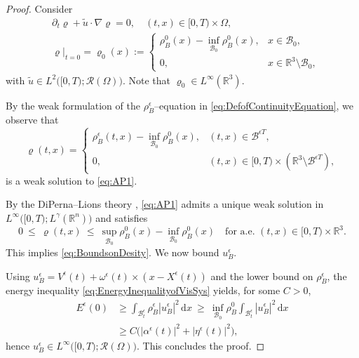 \documentclass[11pt,twoside,reqno]{amsart}
\numberwithin{equation}{section}
\numberwithin{figure}{section}
\begin{document}
\begin{proof}
Consider
\begin{equation}\label{eq:AP1}
\begin{aligned}
&\partial_t \varrho + {\tilde{u}}\cdot \nabla \varrho = 0,\quad (t,x)\in [0,T)\times \Omega,\\
&\varrho\big|_{t=0} = \varrho_0(x) :=
\begin{cases}
\rho_B^0(x) - \inf_{\mathcal{B}_0} \rho_B^0(x), & x \in \mathcal{B}_0,\\
0, & x \in \mathbb{R}^3 \setminus \mathcal{B}_0,
\end{cases}
\end{aligned}
\end{equation}
with $\tilde{u} \in L^2\big([0,T); \mathcal{R}(\Omega)\big)$. Note that $\varrho_0 \in L^\infty(\mathbb{R}^3)$.

By the weak formulation of the $\rho_B^\epsilon$–equation in \eqref{eq:DefofContinuityEquation}, we observe that
\[
\varrho(t,x) =
\begin{cases}
\rho_B^\epsilon(t,x) - \inf_{\mathcal{B}_0} \rho_B^0(x), & (t,x) \in \mathcal{B}^{\epsilon T},\\
0, & (t,x) \in [0,T)\times (\mathbb{R}^3 \setminus \mathcal{B}^{\epsilon T}),
\end{cases}
\]
is a weak solution to \eqref{eq:AP1}.

By the DiPerna–Lions theory \cite[Corollary II.1]{diperna1989ordinary}, \eqref{eq:AP1} admits a unique weak solution in $L^\infty\big([0,T); L^\gamma(\mathbb{R}^n)\big)$ and satisfies
\[
0 \ \le \ \varrho(t,x) \ \le \ \sup_{\mathcal{B}_0} \rho_B^0(x) - \inf_{\mathcal{B}_0} \rho_B^0(x)
\quad \text{for a.e. } (t,x)\in [0,T)\times \mathbb{R}^3.
\]
This implies \eqref{eq:BoundsonDesity}. We now bound $u_B^\epsilon$.

Using $u_B^\epsilon = V^\epsilon(t) + \omega^\epsilon(t)\times (x - X^\epsilon(t))$ and the lower bound on $\rho_B^\epsilon$, the energy inequality \eqref{eq:EnergyInequalityofVisSys} yields, for some $C>0$,
\[
\begin{aligned}
E^\epsilon(0)
&\ge \int_{\mathcal{B}_t^\epsilon} \rho_B^\epsilon |u_B^\epsilon|^2 \,\mathrm{d}x
\ \ge\ \inf_{\mathcal{B}_0} \rho_B^0 \int_{\mathcal{B}_t^\epsilon} |u_B^\epsilon|^2 \,\mathrm{d}x \\
&\ge C\Big( |\alpha^\epsilon(t)|^2 + |\eta^\epsilon(t)|^2 \Big),
\end{aligned}
\]
hence $u_B^\epsilon \in L^\infty\big([0,T); \mathcal{R}(\Omega)\big)$. This concludes the proof.
\end{proof}
\end{document}
